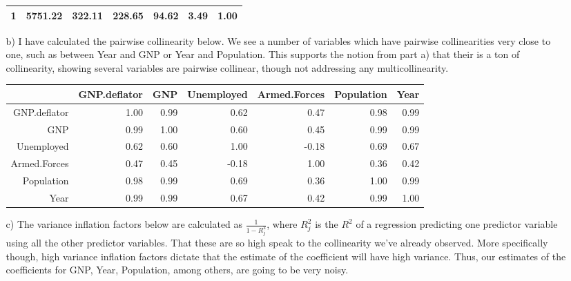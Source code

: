 \documentclass[11pt]{article}
\theoremstyle{definition}
\begin{document}
\begin{itemize}
\begin{itemize}
\begin{table}[ht]
\begin{tabular}{rrrrrrr}
                            1 & 5751.22 & 322.11 & 228.65 & 94.62 & 3.49 & 1.00 \\ 
                               \hline
                           \end{tabular}
                       \end{table}
            \item[b)] 
                I have calculated the pairwise collinearity below. We see a number of variables which have pairwise collinearities very close to one, such as between Year and GNP or Year and Population. This supports the notion from part a) that their is a ton of collinearity, showing several variables are pairwise collinear, though not addressing any multicollinearity. \\
                \begin{table}[ht]
                    \centering
                    \begin{tabular}{rrrrrrr}
                          \hline
                           & GNP.deflator & GNP & Unemployed & Armed.Forces & Population & Year \\ 
                            \hline
                            GNP.deflator & 1.00 & 0.99 & 0.62 & 0.47 & 0.98 & 0.99 \\ 
                              GNP & 0.99 & 1.00 & 0.60 & 0.45 & 0.99 & 0.99 \\ 
                              Unemployed & 0.62 & 0.60 & 1.00 & -0.18 & 0.69 & 0.67 \\ 
                              Armed.Forces & 0.47 & 0.45 & -0.18 & 1.00 & 0.36 & 0.42 \\ 
                              Population & 0.98 & 0.99 & 0.69 & 0.36 & 1.00 & 0.99 \\ 
                              Year & 0.99 & 0.99 & 0.67 & 0.42 & 0.99 & 1.00 \\ 
                               \hline
                           \end{tabular}
                       \end{table}
            \item[c)]
                The variance inflation factors below are calculated as \(\frac{1}{1-R_j^2}\), where \(R_j^2\) is the $R^2$ of a regression predicting one predictor variable using all the other predictor variables. That these are so high speak to the collinearity we've already observed. More specifically though, high variance inflation factors dictate that the estimate of the coefficient will have high variance. Thus, our estimates of the coefficients for GNP, Year, Population, among others, are going to be very noisy. \\

\end{itemize}
\end{itemize}
\end{document}
